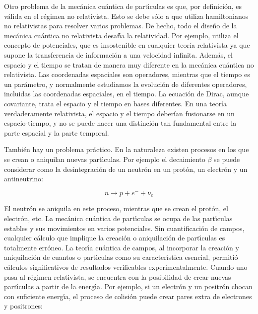 Otro problema de la mec\'{a}nica cu\'{a}ntica de part\'{\i}culas es que, por definici\'{o}n, es v\'{a}lida en el r\'{e}gimen no relativista. Esto se debe s\'{o}lo a que utiliza hamiltonianos no relativistas para resolver varios problemas. De hecho, todo el dise\~{n}o de la mec\'{a}nica cu\'{a}ntica no relativista desaf\'{\i}a la relatividad. Por ejemplo, utiliza el concepto de potenciales, que es insostenible en cualquier teoría relativista ya que supone la transferencia de informaci\'{o}n a una velocidad infinita. Además, el espacio y el tiempo se tratan de manera muy diferente en la mecánica cu\'{a}ntica no relativista. Las coordenadas espaciales son operadores, mientras que el tiempo es un par\'{a}metro, y normalmente estudiamos la evoluci\'{o}n de diferentes operadores, incluidas las coordenadas espaciales, en el tiempo. La ecuaci\'{o}n de Dirac, aunque covariante, trata el espacio y el tiempo en bases diferentes. En una teoría verdaderamente relativista, el espacio y el tiempo deberían fusionarse en un espacio-tiempo, y no se puede hacer una distinci\'{o}n tan fundamental entre la parte espacial y la parte temporal.

Tambi\'{e}n hay un problema pr\'{a}ctico. En la naturaleza existen procesos en los que se crean o aniquilan nuevas part\'{\i}culas. Por ejemplo el decaimiento $\beta $ se puede considerar como la desintegraci\'{o}n de un neutr\'{o}n en un prot\'{o}n, un electr\'{o}n y un antineutrino:

\begin{equation}
n\rightarrow p+e^{-}+\overline{\nu }_{e}  \label{1}
\end{equation}

El neutr\'{o}n se aniquila en este proceso, mientras que se crean el prot\'{o}n, el electr\'{o}n, etc. La mec\'{a}nica cu\'{a}ntica de part\'{\i}culas se ocupa de las part\'{\i}culas estables y sus movimientos en varios potenciales. Sin cuantificaci\'{o}n de campos, cualquier c\'{a}lculo que implique la creaci\'{o}n o aniquilaci\'{o}n de part\'{\i}culas es totalmente err\'{o}neo. La teor\'{\i}a cu\'{a}ntica de campos, al incorporar la creaci\'{o}n y aniquilaci\'{o}n de cuantos o part\'{\i}culas como su caracter\'{\i}stica esencial, permiti\'{o} c\'{a}lculos significativos de resultados verificables experimentalmente. Cuando uno pasa al r\'{e}gimen relativista, se encuentra con la posibilidad de crear nuevas part\'{\i}culas a partir de la energ\'{\i}a. Por ejemplo, si un electr\'{o}n y un positr\'{o}n chocan con suficiente energ\'{\i}a, el proceso de colisi\'{o}n puede crear pares extra de electrones y positrones:

